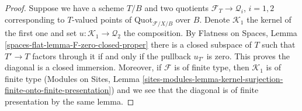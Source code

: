 \documentclass[10pt,a4paper]{amsart}
\theoremstyle{plain}
\theoremstyle{definition}
\theoremstyle{remark}
\numberwithin{equation}{subsection}
\def\Quotfunctor{\mathrm{Quot}}
\begin{document}
\begin{proof}
Suppose we have a scheme $T/B$ and two quotients
$\mathcal{F}_T \to \mathcal{Q}_i$, $i = 1, 2$ corresponding
to $T$-valued points of $\Quotfunctor_{\mathcal{F}/X/B}$ over $B$.
Denote $\mathcal{K}_1$ the kernel of the first one and set
$u : \mathcal{K}_1 \to \mathcal{Q}_2$ the composition.
By Flatness on Spaces, Lemma \ref{spaces-flat-lemma-F-zero-closed-proper}
there is a closed subspace of $T$ such that $T' \to T$
factors through it if and only if the pullback $u_{T'}$ is zero.
This proves the diagonal is a closed immersion.
Moreover, if $\mathcal{F}$ is of finite type, then
$\mathcal{K}_1$ is of finite type
(Modules on Sites, Lemma
\ref{sites-modules-lemma-kernel-surjection-finite-onto-finite-presentation})
and we see that the diagonal is of finite presentation by
the same lemma.
\end{proof}
\end{document}
